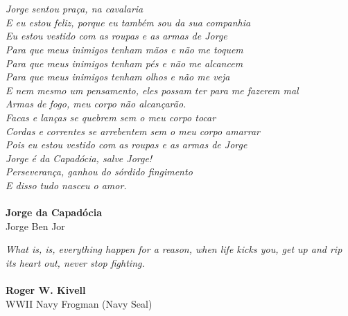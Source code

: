 \chapter*{}
\vfill

\begin{flushright}{}
\emph{Jorge sentou praça, na cavalaria \\
E eu estou feliz, porque eu também sou da sua companhia \\
Eu estou vestido com as roupas e as armas de Jorge \\
Para que meus inimigos tenham mãos e não me toquem \\
Para que meus inimigos tenham pés e não me alcancem \\
Para que meus inimigos tenham olhos e não me veja \\
E nem mesmo um pensamento, eles possam ter para me fazerem mal \\
Armas de fogo, meu corpo não alcançarão. \\
Facas e lanças se quebrem sem o meu corpo tocar \\
Cordas e correntes se arrebentem sem o meu corpo amarrar \\
Pois eu estou vestido com as roupas e as armas de Jorge \\
Jorge é da Capadócia, salve Jorge! \\
Perseverança, ganhou do sórdido fingimento \\
E disso tudo nasceu o amor.}\\ 
\quad \\
{\small \textbf{Jorge da Capadócia} \quad \\ Jorge Ben Jor}
\end{flushright}{\small \par}

\begin{flushright}{}
\emph{What is, is, everything happen for a reason, when life kicks you, get up and rip its heart out, never stop fighting.}\\ 
\quad \\
{\small \textbf{Roger W. Kivell} \quad \\ WWII Navy Frogman (Navy Seal)}
\end{flushright}{\small \par}

\newpage
